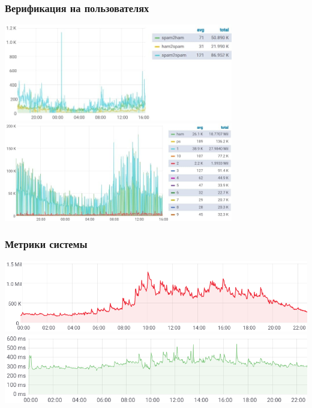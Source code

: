 \documentclass[compress,professionalfont]{beamer}
\begin{document}
\begin{frame}
\frametitle{Верификация на пользователях}

\begin{center}
\includegraphics[width=0.75\textwidth]{old_vs_new_status.jpg}
\includegraphics[width=0.75\textwidth]{dist_prob.jpg}
\end{center}

\end{frame}

\begin{frame}
\frametitle{Метрики системы}

\begin{center}
\includegraphics[width=1.0\textwidth]{processed_messages.png}
\includegraphics[width=1.0\textwidth]{timings.png}
\end{center}

\end{frame}
\end{document}
